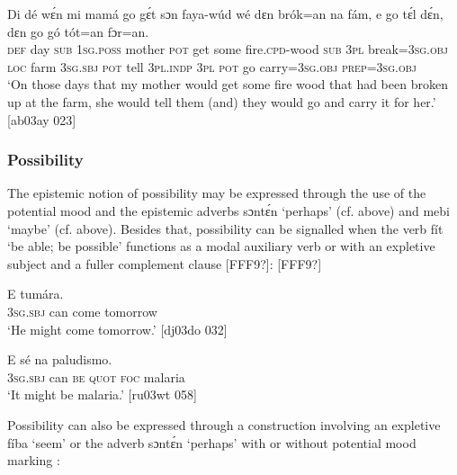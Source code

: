 \ea%
    \label{ex:key:448}
    \gll Di  dé  wɛ́n    mi    mamá  go  gɛ́t  sɔn    faya-wúd    wé
dɛn  brók=an    na  fám,    e    go  tɛ́l  dɛ́n,    dɛn  go  gó
tót=an    fɔr=an.\\
\textsc{def}  day  \textsc{sub}    \textsc{1sg.poss}  mother  \textsc{pot}  get  some  fire.\textsc{cpd}{}-wood    \textsc{sub}
\textsc{3pl}  break=\textsc{3sg.obj}  \textsc{loc}  farm  \textsc{3sg.sbj}  \textsc{pot}  tell  \textsc{3pl.indp}  \textsc{3pl}  \textsc{pot}  go
carry=\textsc{3sg.obj}  \textsc{prep=3sg.obj}\\

\glt ‘On those days that my mother would get some fire wood that had been 
broken up at the farm, she would tell them (and) they would go and carry 
it for her.’ [ab03ay 023]
\z

\subsubsection{Possibility}\label{sec:6.7.4.2}

The epistemic notion of possibility may be expressed through the use of the potential mood and the epistemic adverbs sɔntɛ́n ‘perhaps’ (cf.  above) and mebi ‘maybe’ (cf.  above). Besides that, possibility can be signalled when the verb fít ‘be able; be possible’ functions as a modal auxiliary verb  or with an expletive subject and a fuller complement clause [FFF9?]: [FFF9?]


\ea%
    \label{ex:key:449}
    \gll E          tumára.\\
\textsc{3sg.sbj}  can  come  tomorrow\\

\glt ‘He might come tomorrow.’ [dj03do 032]
\z


\ea%
    \label{ex:key:450}
    \gll E      sé    na  paludismo.\\
\textsc{3sg.sbj}  can  \textsc{be}  \textsc{quot}    \textsc{foc}  malaria\\

\glt ‘It might be malaria.’ [ru03wt 058]
\z

Possibility can also be expressed through a construction involving an expletive fíba ‘seem’  or the adverb sɔntɛ́n ‘perhaps’ with or without potential mood marking :


